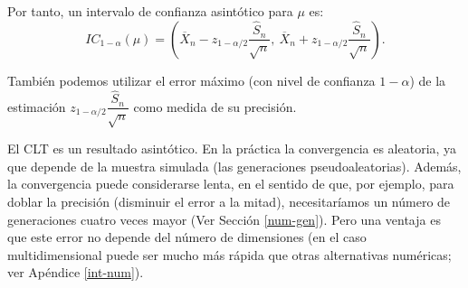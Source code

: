 \documentclass[
  spanish,
  10pt,
]{book}
\theoremstyle{break}
\theoremstyle{nonumberplain}
\begin{document}
Por tanto, un intervalo de confianza asintótico para \(\mu\) es:
\[IC_{1-\alpha }(\mu ) = \left( \overline{X}_{n}
- z_{1-\alpha /2}\dfrac{\widehat{S}_{n}}{\sqrt{n}},\ 
\overline{X}_n+z_{1-\alpha /2}\dfrac{\widehat{S}_{n}}{\sqrt{n}} \right).\]

También podemos utilizar el error máximo (con nivel de confianza \(1-\alpha\)) de la estimación \(z_{1-\alpha /2}\dfrac{\widehat{S}_{n}}{\sqrt{n}}\) como medida de su precisión.

El CLT es un resultado asintótico. En la práctica la convergencia es aleatoria, ya que depende de la muestra simulada (las generaciones pseudoaleatorias).
Además, la convergencia puede considerarse lenta, en el sentido de que, por ejemplo, para doblar la precisión (disminuir el error a la mitad), necesitaríamos un número de generaciones cuatro veces mayor (Ver Sección \ref{num-gen}).
Pero una ventaja es que este error no depende del número de dimensiones (en el caso multidimensional puede ser mucho más rápida que otras alternativas numéricas; ver Apéndice \ref{int-num}).
\end{document}
